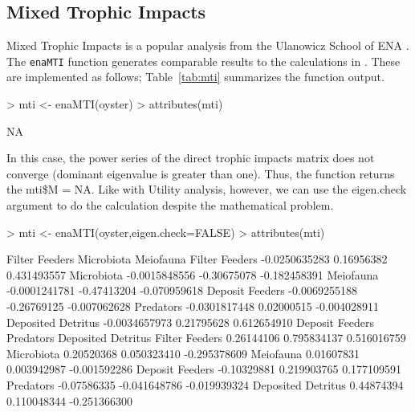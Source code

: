 \documentclass[article]{jss}
\begin{document}

\subsection{Mixed Trophic Impacts}
Mixed Trophic Impacts is a popular analysis from the Ulanowicz School
of ENA \citep{ulanowicz90}.  The \texttt{enaMTI} function generates
comparable results to the calculations in \citet{ulanowicz90}.  These
are implemented as follows; Table~\ref{tab:mti} summarizes the
function output.

\begin{Schunk}
\begin{Sinput}
> mti <- enaMTI(oyster)
> attributes(mti)
\end{Sinput}
\begin{Soutput}
[1] NA
\end{Soutput}
\end{Schunk}

In this case, the power series of the direct trophic impacts matrix
does not converge (dominant eigenvalue is greater than one).  Thus,
the function returns the mti\$M = NA.  Like with Utility analysis,
however, we can use the eigen.check argument to do the calculation
despite the mathematical problem.

\begin{Schunk}
\begin{Sinput}
> mti <- enaMTI(oyster,eigen.check=FALSE)
> attributes(mti)
\end{Sinput}
\begin{Soutput}
                   Filter Feeders  Microbiota    Meiofauna
Filter Feeders      -0.0250635283  0.16956382  0.431493557
Microbiota          -0.0015848556 -0.30675078 -0.182458391
Meiofauna           -0.0001241781 -0.47413204 -0.070959618
Deposit Feeders     -0.0069255188 -0.26769125 -0.007062628
Predators           -0.0301817448  0.02000515 -0.004028911
Deposited Detritus  -0.0034657973  0.21795628  0.612654910
                   Deposit Feeders    Predators Deposited Detritus
Filter Feeders          0.26144106  0.795834137        0.516016759
Microbiota              0.20520368  0.050323410       -0.295378609
Meiofauna               0.01607831  0.003942987       -0.001592286
Deposit Feeders        -0.10329881  0.219903765        0.177109591
Predators              -0.07586335 -0.041648786       -0.019939324
Deposited Detritus      0.44874394  0.110048344       -0.251366300
\end{Soutput}
\end{Schunk}
\end{document}

